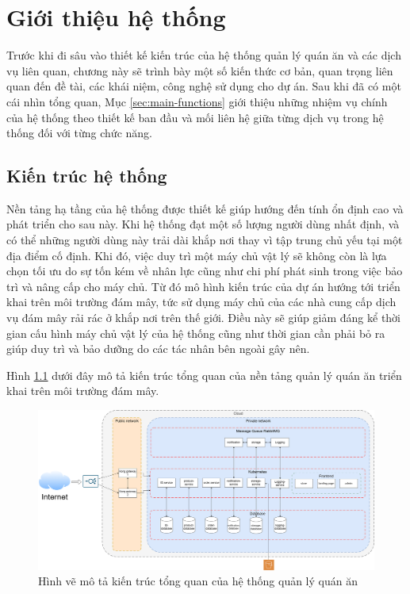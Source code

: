 \chapter{Giới thiệu hệ thống}\label{chap1}
Trước khi đi sâu vào thiết kế kiến trúc của hệ thống quản lý quán ăn và các dịch vụ liên quan, chương này sẽ trình bày một số kiến thức cơ bản, quan trọng liên quan đến đề tài, các khái niệm, công nghệ sử dụng cho dự án.
Sau khi đã có một cái nhìn tổng quan, Mục \autoref{sec:main-functions} giới thiệu những nhiệm vụ chính của hệ thống theo thiết kế ban đầu và mối liên hệ giữa từng dịch vụ trong hệ thống đối với từng chức năng.

\section{Kiến trúc hệ thống}
Nền tảng hạ tầng của hệ thống được thiết kế giúp hướng đến tính ổn định cao và phát triển cho sau này.
Khi hệ thống đạt một số lượng người dùng nhất định, và có thể những người dùng này trải dài khắp nơi thay vì tập trung chủ yếu tại một địa điểm cố định.
Khi đó, việc duy trì một máy chủ vật lý sẽ không còn là lựa chọn tối ưu do sự tốn kém về nhân lực cũng như chi phí phát sinh trong việc bảo trì và nâng cấp cho máy chủ.
Từ đó mô hình kiến trúc của dự án hướng tới triển khai trên môi trường đám mây, tức sử dụng máy chủ của các nhà cung cấp dịch vụ đám mây rải rác ở khắp nơi trên thế giới.
Điều này sẽ giúp giảm đáng kể thời gian cấu hình máy chủ vật lý của hệ thống cũng như thời gian cần phải bỏ ra giúp duy trì và bảo dưỡng do các tác nhân bên ngoài gây nên.

Hình \ref{fig:overall-architecture} dưới đây mô tả kiến trúc tổng quan của nền tảng quản lý quán ăn triển khai trên môi trường đám mây.

\begin{figure}[h]
	\centering
	\includegraphics[width=1.1\textwidth]{images/hChip/overall-architecture.png}
	\caption{Hình vẽ mô tả kiến trúc tổng quan của hệ thống quản lý quán ăn}
	\label{fig:overall-architecture}
\end{figure}

